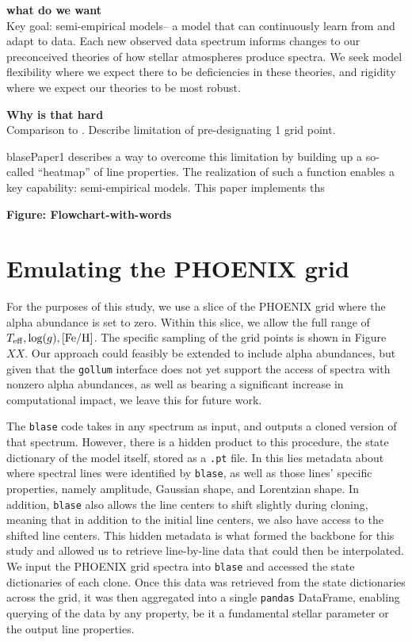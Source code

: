 \documentclass[twocolumn]{aastex631}
\def\Teff{T_{\rm eff}}
\def\logg{\log(g)}
\def\Z{\mathrm{[Fe/H]}}
\begin{document}
\textbf{what do we want}\\
Key goal: semi-empirical models-- a model that can continuously learn from and adapt to data.  Each new observed data spectrum informs changes to our preconceived theories of how stellar atmospheres produce spectra.  We seek model flexibility where we expect there to be deficiencies in these theories, and rigidity where we expect our theories to be most robust.

\textbf{Why is that hard}\\



Comparison to \citet{czekala15}.  Describe limitation of pre-designating 1 grid point.




blasePaper1 describes a way to overcome this limitation by building up a so-called ``heatmap'' of line properties.  The realization of such a function enables a key capability: semi-empirical models.
This paper implements ths



\begin{mdframed}
    \textbf{Figure: Flowchart-with-words}
\end{mdframed}

\section{Emulating the PHOENIX grid}

For the purposes of this study, we use a slice of the PHOENIX grid where the alpha abundance
is set to zero. Within this slice, we allow the full range of $\Teff, \logg, \Z$. The specific
sampling of the grid points is shown in Figure $XX$. Our approach could feasibly be extended to
include alpha abundances, but given that the \texttt{gollum} interface does not yet support the access
of spectra with nonzero alpha abundances, as well as bearing a significant increase in computational 
impact, we leave this for future work.

The \texttt{blase} code takes in any spectrum as input, and outputs a cloned
version of that spectrum. However, there is a hidden product to this
procedure, the state dictionary of the model itself, stored as a \texttt{.pt} file. In this lies metadata about
where spectral lines were identified by \texttt{blase}, as well as those lines'
specific properties, namely amplitude, Gaussian shape, and Lorentzian shape.
In addition, \texttt{blase} also allows the line centers to shift slightly during
cloning, meaning that in addition to the initial line centers, we 
also have access to the shifted line centers. This hidden metadata is 
what formed the backbone for this study and allowed us to retrieve line-by-line data
that could then be interpolated. We input the PHOENIX grid spectra into \texttt{blase}
and accessed the state dictionaries of each clone. Once this data was retrieved from the state dictionaries
across the grid, it was then aggregated into a single \texttt{pandas} DataFrame, enabling
querying of the data by any property, be it a fundamental stellar parameter or the output
line properties.
\end{document}
